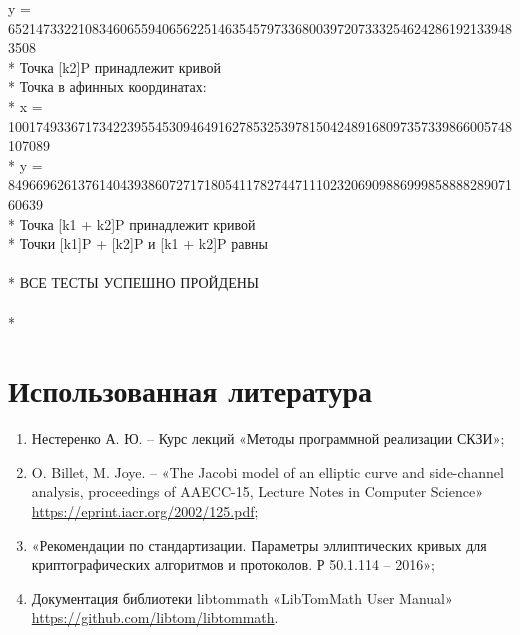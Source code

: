 \documentclass[12pt]{article}
\begin{document}
y = 6521473322108346065594065622514635457973368003972073332546242861921339483508\\*
Точка [k2]P принадлежит кривой\\*
Точка в афинных координатах:\\*
x = 100174933671734223955453094649162785325397815042489168097357339866005748107089\\*
y = 84966962613761404393860727171805411782744711102320690988699985888828907160639\\*
Точка [k1 + k2]P принадлежит кривой\\*
Точки [k1]P + [k2]P и [k1 + k2]P равны\\
\\*
ВСЕ ТЕСТЫ УСПЕШНО ПРОЙДЕНЫ\\
\\*



\section{Использованная литература}
\begin{enumerate}
\item Нестеренко А. Ю. – Курс лекций «Методы программной реализации
СКЗИ»;
\item O. Billet, M. Joye. – «The Jacobi model of an elliptic curve and side-channel
analysis, proceedings of AAECC-15, Lecture Notes in Computer Science» \url{https://eprint.iacr.org/2002/125.pdf};
\item «Рекомендации по стандартизации. Параметры эллиптических кривых
для криптографических алгоритмов и протоколов. Р 50.1.114 – 2016»;
\item Документация библиотеки libtommath «LibTomMath User Manual» \url{https://github.com/libtom/libtommath}.
\end{enumerate}
\end{document}
